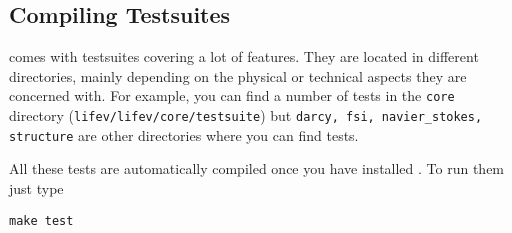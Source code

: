 \subsection{Compiling Testsuites}

\noindent \lifev comes with testsuites covering a lot of features. They are located in different directories, mainly depending on the physical or technical aspects they are concerned with. For example, you can find a number of tests in the \verb+core+
directory (\verb+lifev/lifev/core/testsuite+) but \verb+darcy, fsi, navier_stokes, structure+ are other directories where you can find tests.%

All these tests are automatically compiled once you have installed \lifev. To run them just type
\begin{verbatim}
make test
\end{verbatim}



%

%
%
